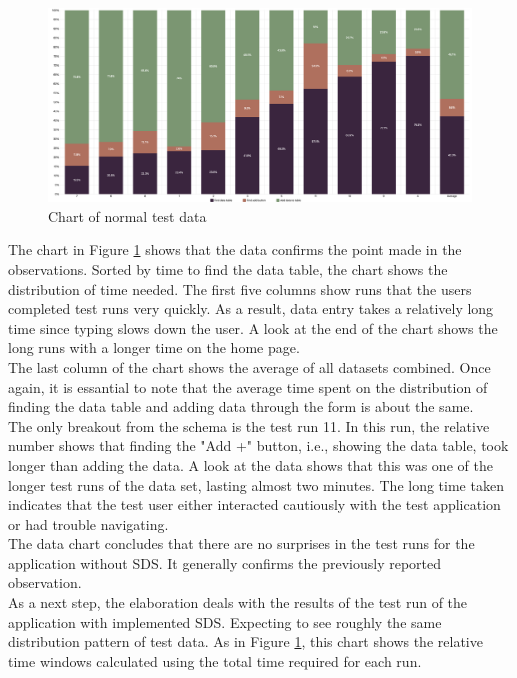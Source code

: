 \begin{figure}[htbp]
    \centerline{
    \includegraphics[width=\linewidth]{images/normal_test_data_chart.png}}
\caption{Chart of normal test data}
\label{test_data_normal}
\end{figure}
The chart in Figure \ref{test_data_normal} shows that the data confirms the point made in the observations. Sorted by time to find the data table, the chart shows the distribution of time needed. The first five columns show runs that the users completed test runs very quickly. As a result, data entry takes a relatively long time since typing slows down the user. A look at the end of the chart shows the long runs with a longer time on the home page. \\
The last column of the chart shows the average of all datasets combined. Once again, it is essantial to note that the average time spent on the distribution of finding the data table and adding data through the form is about the same. \\
The only breakout from the schema is the test run 11. In this run, the relative number shows that finding the "Add +" button, i.e., showing the data table, took longer than adding the data. A look at the data shows that this was one of the longer test runs of the data set, lasting almost two minutes. The long time taken indicates that the test user either interacted cautiously with the test application or had trouble navigating. \\
The data chart concludes that there are no surprises in the test runs for the application without SDS. It generally confirms the previously reported observation.\\

As a next step, the elaboration deals with the results of the test run of the application with implemented SDS. Expecting to see roughly the same distribution pattern of test data.  As in Figure \ref{test_data_normal}, this chart shows the relative time windows calculated using the total time required for each run. \\

